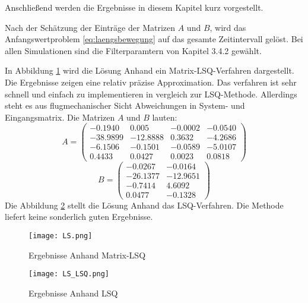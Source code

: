 Anschließend werden die Ergebnisse in diesem Kapitel kurz vorgestellt.\par
 \noindent Nach der Schätzung der Einträge der Matrizen $A$ und $B$, wird das Anfangswertproblem \eqref{eq:laengsbewegung} auf das gesamte Zeitintervall gelöst. Bei allen Simulationen sind die Filterparamtern von Kapitel 3.4.2 gewählt.\par
 \noindent In Abbildung \ref{fig:Ergebnisse_zmlsq} wird die Lösung Anhand ein Matrix-LSQ-Verfahren dargestellt. Die Ergebnisse zeigen eine relativ präzise Approximation. Das verfahren ist sehr schnell und einfach zu implementieren in vergleich zur LSQ-Methode.  Allerdings steht es aus flugmechanischer Sicht Abweichungen in System- und Eingangsmatrix. Die Matrizen $A$ und $B$ lauten: 
 \[ A = \begin{pmatrix}
 -0.1940 & 0.005 & -0.0002 & -0.0540 \\
 -38.9899 & -12.8888 & 0.3632 & -4.2686 \\
 -6.1506 & -0.1501 & -0.0589 & -5.0107 \\
 0.4433 & 0.0427 & 0.0023 & 0.0818
 \end{pmatrix}
 \] 
 \[ B = \begin{pmatrix}
 -0.0267 & -0.0164 \\ 
 -26.1377 & -12.9651 \\
 -0.7414 & 4.6092 \\
 0.0477 & -0.1328
 \end{pmatrix}
 \]
 \noindent Die Abbildung \ref{fig:Ergebnisse_zlsq} stellt die Lösung Anhand das LSQ-Verfahren. Die Methode liefert keine sonderlich guten Ergebnisse. 
 \begin{figure}[h!]
	\centering
	\texttt{[image: LS.png]}
	\caption{Ergebnisse Anhand Matrix-LSQ }
    \label{fig:Ergebnisse_zmlsq}
\end{figure}

 \begin{figure}[h!]
	\centering
	\texttt{[image: LS\_LSQ.png]}
	\caption{Ergebnisse Anhand LSQ}
     \label{fig:Ergebnisse_zlsq} 
\end{figure}
